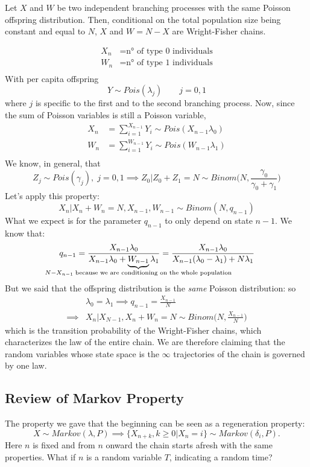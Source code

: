 \documentclass{article}
\begin{document}
	\begin{proposition}
		Let $X$ and $W$ be two independent branching processes with the same Poisson offspring distribution. Then, conditional on the total population size being constant and equal to $N$, $X$ and $W=N-X$ are Wright-Fisher chains.
	\end{proposition}
	\begin{proof2}
		\begin{align*}
			X_n&=\text{n° of type 0 individuals}\\
			W_n&=\text{n° of type 1 individuals}\\
		\end{align*}
		With per capita offspring
		\[
		Y\sim Pois(\lambda_j) \qquad j=0,1
		\]
		where $j$ is specific to the first and to the second branching process. Now, since the sum of Poisson variables is still a Poisson variable,
		\begin{align*}
			X_n &= \sum_{i=1}^{X_{n-1}}Y_i \sim Pois(X_{n-1}\lambda_0)\\
			W_n &= \sum_{i=1}^{W_{n-1}}Y_i \sim Pois(W_{n-1}\lambda_1)\\
		\end{align*}
		We know, in general, that
		\[
		Z_j\sim Pois(\gamma_j),\;j=0,1 \implies Z_0|Z_0+Z_1=N\sim Binom\biggl(N,\frac{\gamma_0}{\gamma_0+\gamma_1}\biggr)
		\]
		Let's apply this property:
		\[
		X_n|X_n+W_n=N,X_{n-1},W_{n-1}\sim Binom(N,q_{n-1})
		\]
		What we expect is for the parameter $q_{n-1}$ to only depend on state $n-1$. We know that:
		\[
		q_{n-1}=\frac{X_{n-1}\lambda_0}{X_{n-1}\lambda_0+\underbrace{W_{n-1}}_{\mathclap{N-X_{n-1}\;\text{because we are conditioning on the whole population}}}\lambda_1}=\frac{X_{n-1}\lambda_0}{X_{n-1}(\lambda_0-\lambda_1)+N\lambda_1}
		\]
		But we said that the offspring distribution is the \textit{same} Poisson distribution: so
		\begin{align*}
			&\lambda_0=\lambda_1\implies q_{n-1}=\frac{X_{n-1}}{N}\\
			\implies &X_n|X_{N-1},X_n+W_n=N \sim Binom\biggl(N,\frac{X_{n-1}}{N}\biggr)
		\end{align*}
		which is the transition probability of the Wright-Fisher chains, which characterizes the law of the entire chain. We are therefore claiming that the random variables whose state space is the $\infty$ trajectories of the chain is governed by one law.
	\end{proof2}
	\subsection{Review of Markov Property}
	The property we gave that the beginning can be seen as a regeneration property:
	\[
	X\sim Markov(\lambda,P) \implies \{X_{n+k},k\geqslant 0|X_n=i\}\sim Markov(\delta_i,P).
	\] 
	Here $n$ is fixed and from $n$ onward the chain starts afresh with the same properties. What if $n$ is a random variable $T$, indicating a random time?
	
\end{document}
